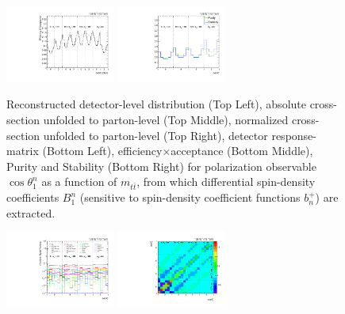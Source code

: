 \begin{refsection}
\begin{figure}[htb]
\begin{center}
 \includegraphics[width=0.32\textwidth]{fig_fullRun2UL/unfolding/combined/TotEff_b1n_mttbar.pdf}
 \includegraphics[width=0.32\textwidth]{fig_fullRun2UL/unfolding/combined/PurStab_b1n_mttbar.pdf} \\
\caption{Reconstructed detector-level distribution (Top Left), absolute cross-section unfolded to parton-level (Top Middle), normalized cross-section unfolded to parton-level (Top Right), detector response-matrix (Bottom Left), efficiency$\times$acceptance (Bottom Middle), Purity and Stability (Bottom Right) for polarization observable $\cos\theta_{1}^{n}$ as a function of $m_{t\bar{t}}$, from which differential spin-density coefficients $B_{1}^{n}$ (sensitive to spin-density coefficient functions $b_n^{+}$) are extracted.}
\label{fig:b1n_mttbar}
\end{center}
\end{figure}
\clearpage
\begin{figure}[htb]
\begin{center}
 \includegraphics[width=0.32\textwidth]{fig_fullRun2UL/unfolding/combined/deltaSystCombinedlog_rebinnedB_b1n_mttbar.pdf}
 \includegraphics[width=0.32\textwidth]{fig_fullRun2UL/unfolding/combined/StatCovMatrix_rebinnedB_b1n_mttbar.pdf}

\end{center}
\end{figure}
\end{refsection}
